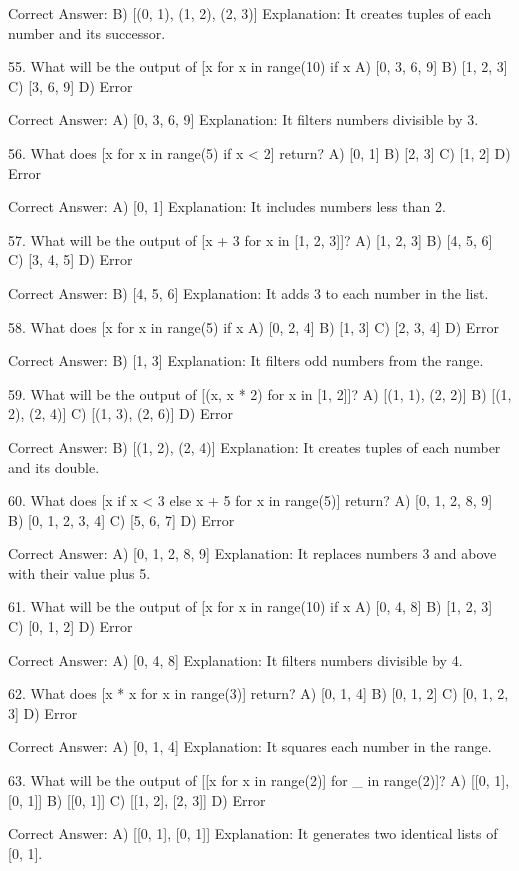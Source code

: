 Correct Answer: B) [(0, 1), (1, 2), (2, 3)]
Explanation: It creates tuples of each number and its successor.

55. What will be the output of [x for x in range(10) if x %
A) [0, 3, 6, 9]
B) [1, 2, 3]
C) [3, 6, 9]
D) Error

Correct Answer: A) [0, 3, 6, 9]
Explanation: It filters numbers divisible by 3.

56. What does [x for x in range(5) if x < 2] return?
A) [0, 1]
B) [2, 3]
C) [1, 2]
D) Error

Correct Answer: A) [0, 1]
Explanation: It includes numbers less than 2.

57. What will be the output of [x + 3 for x in [1, 2, 3]]?
A) [1, 2, 3]
B) [4, 5, 6]
C) [3, 4, 5]
D) Error

Correct Answer: B) [4, 5, 6]
Explanation: It adds 3 to each number in the list.

58. What does [x for x in range(5) if x %
A) [0, 2, 4]
B) [1, 3]
C) [2, 3, 4]
D) Error

Correct Answer: B) [1, 3]
Explanation: It filters odd numbers from the range.

59. What will be the output of [(x, x * 2) for x in [1, 2]]?
A) [(1, 1), (2, 2)]
B) [(1, 2), (2, 4)]
C) [(1, 3), (2, 6)]
D) Error

Correct Answer: B) [(1, 2), (2, 4)]
Explanation: It creates tuples of each number and its double.

60. What does [x if x < 3 else x + 5 for x in range(5)] return?
A) [0, 1, 2, 8, 9]
B) [0, 1, 2, 3, 4]
C) [5, 6, 7]
D) Error

Correct Answer: A) [0, 1, 2, 8, 9]
Explanation: It replaces numbers 3 and above with their value plus 5.

61. What will be the output of [x for x in range(10) if x %
A) [0, 4, 8]
B) [1, 2, 3]
C) [0, 1, 2]
D) Error

Correct Answer: A) [0, 4, 8]
Explanation: It filters numbers divisible by 4.

62. What does [x * x for x in range(3)] return?
A) [0, 1, 4]
B) [0, 1, 2]
C) [0, 1, 2, 3]
D) Error

Correct Answer: A) [0, 1, 4]
Explanation: It squares each number in the range.

63. What will be the output of [[x for x in range(2)] for _ in range(2)]?
A) [[0, 1], [0, 1]]
B) [[0, 1]]
C) [[1, 2], [2, 3]]
D) Error

Correct Answer: A) [[0, 1], [0, 1]]
Explanation: It generates two identical lists of [0, 1].


